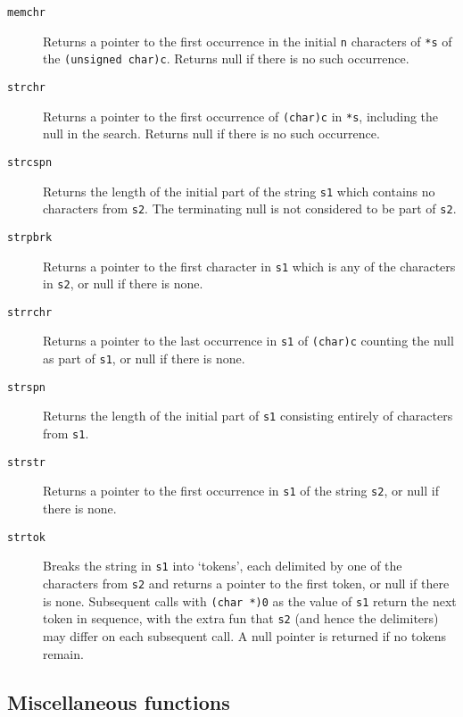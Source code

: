    \begin{description}
    \item[\texttt{memchr}] Returns a pointer to the first occurrence in the  initial
     \texttt{n} characters of \texttt{*s} of the \texttt{(unsigned
     char)c}.  Returns null if there is no such occurrence.

    \item[\texttt{strchr}] Returns a pointer to the first occurrence of  \texttt{(char)c}  in
     \texttt{*s},  including  the  null in the search.  Returns null if
     there is no such occurrence.

    \item[\texttt{strcspn}] Returns the length of the initial part of the  string  \texttt{s1}
     which  contains  no  characters from \texttt{s2}.  The terminating
     null is not considered to be part of \texttt{s2}.

    \item[\texttt{strpbrk}] Returns a pointer to the first character in \texttt{s1}  which  is
     any of the characters in \texttt{s2}, or null if there is none.

    \item[\texttt{strrchr}] Returns a pointer to the last occurrence in \texttt{s1} of
     \texttt{(char)c} counting  the  null  as  part  of \texttt{s1}, or
     null if there is none.

    \item[\texttt{strspn}] Returns the length of the initial part of  \texttt{s1}  consisting
     entirely of characters from \texttt{s1}.

    \item[\texttt{strstr}] Returns a pointer to the first occurrence in  \texttt{s1}  of  the
     string \texttt{s2}, or null if there is none.

    \item[\texttt{strtok}] Breaks the string in \texttt{s1} into `tokens', each
     delimited  by one  of  the  characters from \texttt{s2} and returns
     a pointer to the first token, or null if there  is  none.   Subsequent
     calls  with  \texttt{(char *)0} as the value of \texttt{s1}
     return the next token in sequence, with the extra fun that \texttt{s2}
     (and hence the  delimiters)  may  differ on each subsequent call.  A null
     pointer is returned if no tokens remain.
   \end{description}

  

  \subsection{Miscellaneous functions}
   

